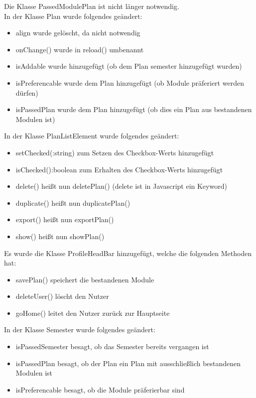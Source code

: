 Die Klasse PassedModulePlan ist nicht länger notwendig.\\
In der Klasse Plan wurde folgendes geändert:
\begin{itemize}
	\item align wurde gelöscht, da nicht notwendig
	\item onChange() wurde in reload() umbenannt
	\item isAddable wurde hinzugefügt (ob dem Plan semester hinzugefügt wurden)
	\item isPreferencable wurde dem Plan hinzugefügt (ob Module präferiert werden dürfen)
	\item isPassedPlan wurde dem Plan hinzugefügt (ob dies ein Plan aus bestandenen Modulen ist)
\end{itemize}

In der Klasse PlanListElement wurde folgendes geändert:
\begin{itemize}
	\item setChecked(:string) zum Setzen des Checkbox-Werts hinzugefügt
	\item isChecked():boolean zum Erhalten des Checkbox-Werts hinzugefügt
	\item delete() heißt nun deletePlan() (delete ist in Javascript ein Keyword)
	\item duplicate() heißt nun duplicatePlan()
	\item export() heißt nun exportPlan()
	\item show() heißt nun showPlan()
\end{itemize}

Es wurde die Klasse ProfileHeadBar hinzugefügt, welche die folgenden Methoden hat:
\begin{itemize}
	\item savePlan() speichert die bestandenen Module
	\item deleteUser() löscht den Nutzer
	\item goHome() leitet den Nutzer zurück zur Hauptseite
\end{itemize}

In der Klasse Semester wurde folgendes geändert:
\begin{itemize}
	\item isPassedSemester besagt, ob das Semester bereits vergangen ist
	\item isPassedPlan besagt, ob der Plan ein Plan mit ausschließlich bestandenen Modulen ist
	\item isPreferencable besagt, ob die Module präferierbar sind
\end{itemize}